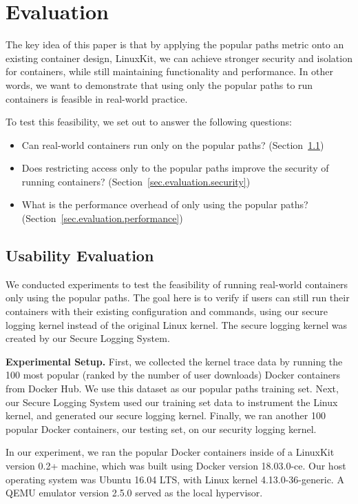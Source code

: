 \section{Evaluation}
\label{sec.evaluation}
The key idea of this paper is that by applying the popular paths metric onto an existing container design, LinuxKit, 
we can achieve stronger security and isolation for containers, while still maintaining functionality and performance. 
In other words, we want to demonstrate that using only the popular paths to run containers is feasible in real-world practice. 

To test this feasibility, we set out to answer the following questions: 

\begin{itemize}
\item Can real-world containers run only on the popular paths? (Section~{\ref{sec.evaluation.usability}})
\item Does restricting access only to the popular paths improve the security of running containers? (Section~{\ref{sec.evaluation.security}})
\item What is the performance overhead of only using the popular paths? (Section~{\ref{sec.evaluation.performance}})
\end{itemize}

\subsection{Usability Evaluation}
\label{sec.evaluation.usability} 
We conducted experiments to test the feasibility of running real-world containers only using the popular paths. 
The goal here is to verify if users can still run their containers with their existing configuration and commands, 
using our secure logging kernel instead of the original Linux kernel. The secure logging kernel was created by our Secure Logging System.

\textbf{Experimental Setup.}
First, we collected the kernel trace data by running the 100 most popular (ranked by the number of user downloads) Docker containers from Docker Hub. 
We use this dataset as our popular paths training set. Next, our Secure Logging System used our training set data to instrument the Linux kernel, 
and generated our secure logging kernel. Finally, we ran another 100 popular Docker containers,  our testing set, on our security logging kernel. 

In our experiment, we ran the popular Docker containers inside of a LinuxKit version 0.2+ machine, which was built using Docker version 18.03.0-ce. 
Our host operating system was Ubuntu 16.04 LTS, with Linux kernel 4.13.0-36-generic. A QEMU emulator version 2.5.0 served as the local hypervisor. 

